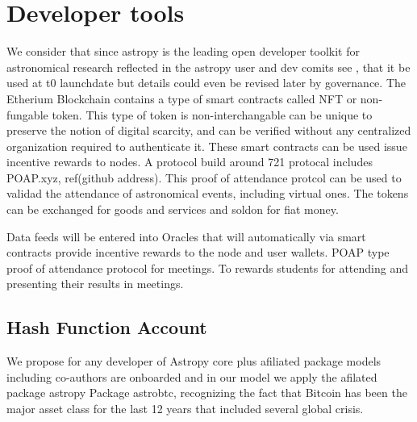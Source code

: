\documentclass[final,5p,times,twocolumn,authoryear]{elsarticle}
\begin{document}
\section{Developer tools}
\label{section:Eth721}
%
We consider that since astropy is the leading open developer toolkit for astronomical research reflected in the astropy  user and dev comits see \cite{ 2020ASPC..522..491T}, that it be used at t0 launchdate but details could even be revised later by governance.  The Etherium Blockchain contains a type of smart contracts called NFT or non-fungable token.  This type of token is non-interchangable can be unique to preserve the notion of digital scarcity, and can be verified without any centralized organization required to authenticate it. These smart contracts can be used issue incentive rewards to nodes. A protocol build around 721 protocal includes POAP.xyz, ref(github address). This proof of attendance protcol can be used to validad the attendance of astronomical events, including virtual ones. The tokens can be exchanged for goods and services and soldon for fiat money.  


Data feeds will be entered into Oracles that will automatically via smart contracts provide incentive rewards to the node and user wallets.
%
POAP type proof of attendance protocol for meetings. To rewards students for attending and presenting their results in meetings.
%
\subsection{Hash Function Account}
We propose for any developer of Astropy core plus afiliated package models including co-authors are onboarded and in our model we apply the afilated package astropy Package astrobtc, recognizing the fact that Bitcoin has been the major asset class for the last 12 years that included several global crisis. 
%
\end{document}
